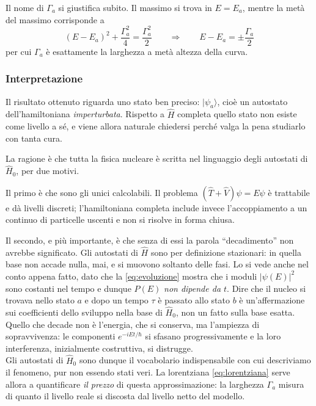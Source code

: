 Il nome di $\Gamma_a$ si giustifica subito. Il massimo si trova in $E = E_a$, mentre la metà del massimo corrisponde a
%
\begin{equation*}
    (E-E_a)^2 + \frac{\Gamma_a^2}{4} = \frac{\Gamma_a^2}{2} \qquad \Longrightarrow \qquad E - E_a = \pm \frac{\Gamma_a}{2}
\end{equation*}
per cui $\Gamma_a$ è esattamente la larghezza a metà altezza della curva.

\subsubsection*{Interpretazione}

Il risultato ottenuto riguarda uno stato ben preciso: $|\psi_a\rangle$, cioè un autostato dell'hamiltoniana \emph{imperturbata}. Rispetto a $\hat{H}$ completa quello stato non esiste come livello a sé, e viene allora naturale chiedersi perché valga la pena studiarlo con tanta cura.

La ragione è che tutta la fisica nucleare è scritta nel linguaggio degli autostati di $\hat{H}_0$, per due motivi.

Il primo è che sono gli unici calcolabili. Il problema $(\hat{T} + \hat{V})\psi = E\psi$ è trattabile e dà livelli discreti; l'hamiltoniana completa include invece l'accoppiamento a un continuo di particelle uscenti e non si risolve in forma chiusa.

Il secondo, e più importante, è che senza di essi la parola ``decadimento'' non avrebbe significato. Gli autostati di $\hat{H}$ sono per definizione stazionari: in quella base non accade nulla, mai, e si muovono soltanto delle fasi. Lo si vede anche nel conto appena fatto, dato che la \eqref{eq:evoluzione} mostra che i moduli $|\psi(E)|^2$ sono costanti nel tempo e dunque $P(E)$ \emph{non dipende da $t$}. Dire che il nucleo si trovava nello stato $a$ e dopo un tempo $\tau$ è passato allo stato $b$ è un'affermazione sui coefficienti dello sviluppo nella base di $\hat{H}_0$, non un fatto sulla base esatta. Quello che decade non è l'energia, che si conserva, ma l'ampiezza di sopravvivenza: le componenti $e^{-iEt/\hbar}$ si sfasano progressivamente e la loro interferenza, inizialmente costruttiva, si distrugge.\\

Gli autostati di $\hat{H}_0$ sono dunque il vocabolario indispensabile con cui descriviamo il fenomeno, pur non essendo stati veri. La lorentziana \eqref{eq:lorentziana} serve allora a quantificare \emph{il prezzo} di questa approssimazione: la larghezza $\Gamma_a$ misura di quanto il livello reale si discosta dal livello netto del modello.

